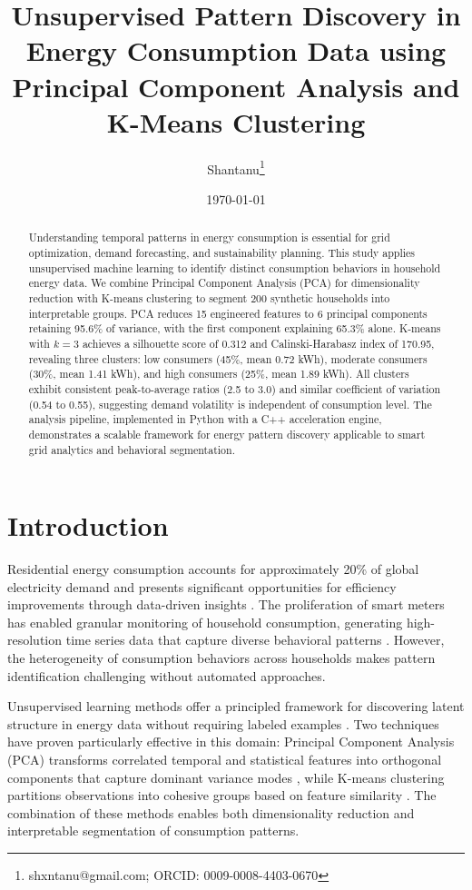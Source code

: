 \documentclass[11pt]{article}
\title{\textbf{Unsupervised Pattern Discovery in Energy Consumption Data using Principal Component Analysis and K-Means Clustering}}
\author[1]{Shantanu\thanks{shxntanu@gmail.com; ORCID: 0009-0008-4403-0670}}
\affil[1]{Independent Researcher}
\date{\today}
\begin{document}
\maketitle

\begin{abstract}
Understanding temporal patterns in energy consumption is essential for grid optimization, demand forecasting, and sustainability planning. This study applies unsupervised machine learning to identify distinct consumption behaviors in household energy data. We combine Principal Component Analysis (PCA) for dimensionality reduction with K-means clustering to segment 200 synthetic households into interpretable groups. PCA reduces 15 engineered features to 6 principal components retaining 95.6\% of variance, with the first component explaining 65.3\% alone. K-means with $k=3$ achieves a silhouette score of 0.312 and Calinski-Harabasz index of 170.95, revealing three clusters: low consumers (45\%, mean 0.72 kWh), moderate consumers (30\%, mean 1.41 kWh), and high consumers (25\%, mean 1.89 kWh). All clusters exhibit consistent peak-to-average ratios (2.5 to 3.0) and similar coefficient of variation (0.54 to 0.55), suggesting demand volatility is independent of consumption level. The analysis pipeline, implemented in Python with a C++ acceleration engine, demonstrates a scalable framework for energy pattern discovery applicable to smart grid analytics and behavioral segmentation.
\end{abstract}

\section{Introduction}

Residential energy consumption accounts for approximately 20\% of global electricity demand and presents significant opportunities for efficiency improvements through data-driven insights \cite{swan2009modeling}. The proliferation of smart meters has enabled granular monitoring of household consumption, generating high-resolution time series data that capture diverse behavioral patterns \cite{albert2016smart}. However, the heterogeneity of consumption behaviors across households makes pattern identification challenging without automated approaches.

Unsupervised learning methods offer a principled framework for discovering latent structure in energy data without requiring labeled examples \cite{hastie2009elements}. Two techniques have proven particularly effective in this domain: Principal Component Analysis (PCA) transforms correlated temporal and statistical features into orthogonal components that capture dominant variance modes \cite{jolliffe2016principal}, while K-means clustering partitions observations into cohesive groups based on feature similarity \cite{macqueen1967some}. The combination of these methods enables both dimensionality reduction and interpretable segmentation of consumption patterns.
\end{document}
